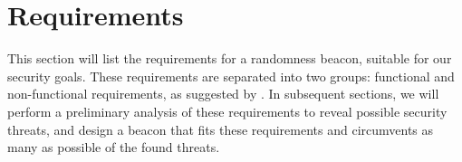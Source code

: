 \section{Requirements}%
\label{sec:beacon_requirements}

This section will list the requirements for a randomness beacon, suitable for our security goals.
These requirements are separated into two groups: functional and non-functional requirements, as suggested by \citet[sec.\ 1.4.1]{swebok}.
In subsequent sections, we will perform a preliminary analysis of these requirements to reveal possible security threats, and design a beacon that fits these requirements and circumvents as many as possible of the found threats.



